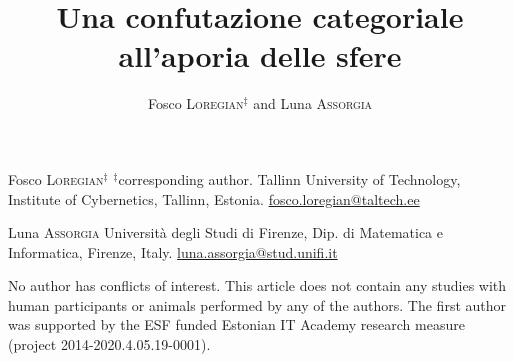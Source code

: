\documentclass[a4paper,9pt]{../birkjour}
\title{Una confutazione categoriale all'aporia delle sfere}
\author{Fosco \textsc{Loregian}$^\ddag$ and Luna \textsc{Assorgia}}
\begin{document}
\scriptsize

\maketitle

\begin{center}
\begin{minipage}{.45\textwidth}
  Fosco \textsc{Loregian}$^\ddag$\newline
  $^\ddag$corresponding author. \newline
Tallinn University of Technology,\newline %
Institute of Cybernetics,\newline
Tallinn, Estonia.\newline
\url{fosco.loregian@taltech.ee}
\end{minipage}\hfill %
\begin{minipage}{.45\textwidth}
  Luna \textsc{Assorgia} \newline
  Università degli Studi di Firenze,\newline
  Dip. di Matematica e Informatica, \newline
  Firenze, Italy.\newline
  \url{luna.assorgia@stud.unifi.it}
\end{minipage}
\end{center}

\vspace*{\fill}%
\normalsize
No author has conflicts of interest. This article does not contain any studies with human participants or animals performed by any of the authors. The first author was supported by the ESF funded Estonian IT Academy research measure (project 2014-2020.4.05.19-0001).
\end{document}
